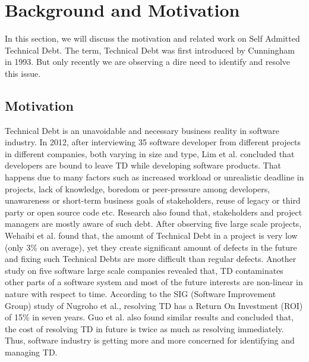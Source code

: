 \section{Background and Motivation}
\label{background}

In this section, we will discuss the motivation and related work on Self Admitted Technical Debt. The term, Technical Debt was first introduced by Cunningham in 1993\cite{cunningham1993wycash}. But only recently we are observing a dire need to identify and resolve this issue. 

\subsection{Motivation}
Technical Debt is an unavoidable and necessary business reality in software industry. In 2012, after interviewing 35 software developer from different projects in different companies, both varying in size and type, Lim et al. concluded that developers are bound to leave TD while developing software products. That happens due to many factors such as increased workload or unrealistic deadline in projects, lack of knowledge, boredom or peer-pressure among developers, unawareness or short-term business goals of stakeholders, reuse of legacy or third party or open source code etc. Research also found that, stakeholders and project managers are mostly aware of such debt\cite{lim2012balancing}\cite{al2014explicating}. After observing five large scale projects, Wehaibi et al. found that, the amount of Technical Debt in a project is very low (only 3\% on average), yet they create significant amount of defects in the future and fixing such Technical Debts are more difficult than regular defects\cite{wehaibi2016examining}. Another study on five software large scale companies revealed that, TD contaminates other parts of a software system and most of the future interests are non-linear in nature with respect to time\cite{martini2015danger}. According to the SIG (Software Improvement Group) study of Nugroho et al., resolving TD has a Return On Investment (ROI) of 15\% in seven years\cite{nugroho2011empirical}. Guo et al. also found similar results and concluded that, the cost of resolving TD in future is twice as much as resolving immediately\cite{guo2011tracking}. Thus, software industry is getting more and more concerned for identifying and managing TD.


